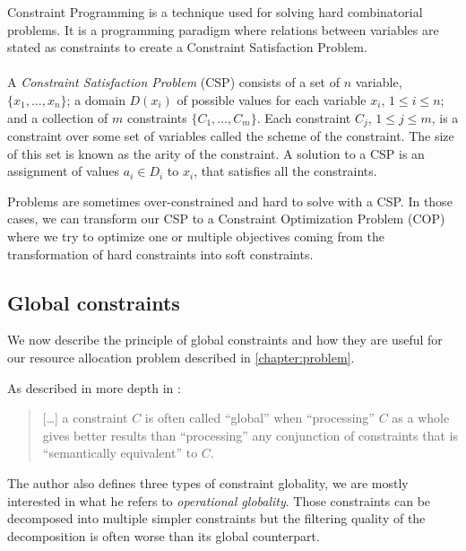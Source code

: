 \documentclass[../../thesis.tex]{subfiles}
\begin{document}
Constraint Programming is a technique used for solving hard combinatorial problems. It is a programming paradigm 
where relations between variables are stated as constraints to create a Constraint Satisfaction Problem.

\paragraph{}

A \emph{Constraint Satisfaction Problem} (CSP) consists of a set of $n$ variable, 
$\{x_1, \dots, x_n \}$; a domain $D(x_i)$ of possible values for each variable $x_i$, 
$1 \leq i \leq n$; and a collection of $m$ constraints $\{ C_1, \dots, C_m \}$. 
Each constraint $C_j$, $1 \leq j \leq m$, is a constraint over some set of variables called the scheme 
of the constraint. The size of this set is known as the arity of the constraint. 
A solution to a CSP is an assignment of values $a_i \in D_i$ to $x_i$, that satisfies all the constraints. \cite{cp-definition}

Problems are sometimes over-constrained and hard to solve with a CSP. In those cases, we can transform our 
CSP to a Constraint Optimization Problem (COP) where we try to optimize one or multiple objectives coming 
from the transformation of hard constraints into soft constraints.

\subsection{Global constraints}


We now describe the principle of global constraints and how they are useful for our resource allocation problem 
described in \autoref{chapter:problem}.

As described in more depth in \cite{Hentenryck:2003}:

\begin{quotation}
  [\dots] a constraint $C$ is often called “global” when “processing” $C$ as a whole gives better results than “processing” any conjunction
  of constraints that is “semantically equivalent” to $C$.
\end{quotation}

The author also defines three types of constraint globality, we are mostly interested in what he refers to \emph{operational globality}. 
Those constraints can be decomposed into multiple simpler constraints but the filtering quality of the decomposition
is often worse than its global counterpart. 
\end{document}
